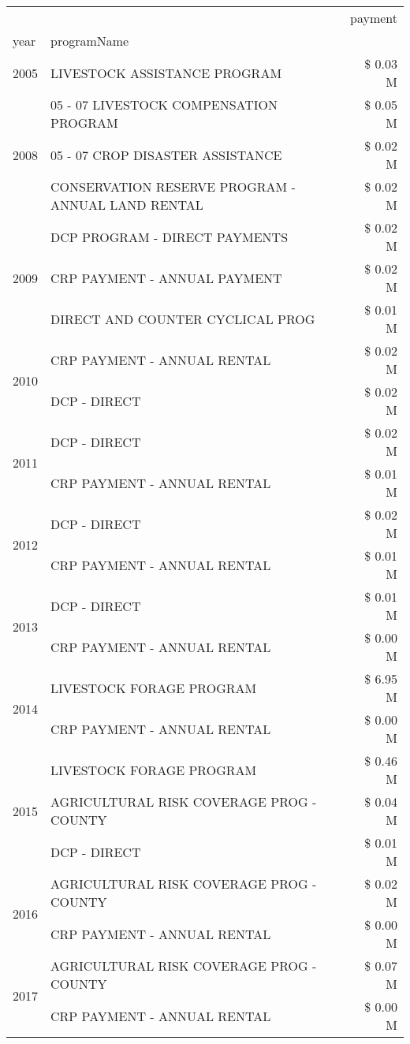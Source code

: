 \begin{tabular}{llr}
\toprule
 &  & payment \\
year & programName &  \\
\midrule
2005 & LIVESTOCK ASSISTANCE PROGRAM & \$ 0.03 M \\
\cline{1-3}
\multirow[t]{3}{*}{2008} & 05 - 07 LIVESTOCK COMPENSATION PROGRAM & \$ 0.05 M \\
 & 05 - 07 CROP DISASTER ASSISTANCE & \$ 0.02 M \\
 & CONSERVATION RESERVE PROGRAM - ANNUAL LAND RENTAL & \$ 0.02 M \\
\cline{1-3}
\multirow[t]{3}{*}{2009} & DCP PROGRAM - DIRECT PAYMENTS & \$ 0.02 M \\
 & CRP PAYMENT - ANNUAL PAYMENT & \$ 0.02 M \\
 & DIRECT AND COUNTER CYCLICAL PROG & \$ 0.01 M \\
\cline{1-3}
\multirow[t]{2}{*}{2010} & CRP PAYMENT - ANNUAL RENTAL & \$ 0.02 M \\
 & DCP - DIRECT & \$ 0.02 M \\
\cline{1-3}
\multirow[t]{2}{*}{2011} & DCP - DIRECT & \$ 0.02 M \\
 & CRP PAYMENT - ANNUAL RENTAL & \$ 0.01 M \\
\cline{1-3}
\multirow[t]{2}{*}{2012} & DCP - DIRECT & \$ 0.02 M \\
 & CRP PAYMENT - ANNUAL RENTAL & \$ 0.01 M \\
\cline{1-3}
\multirow[t]{2}{*}{2013} & DCP - DIRECT & \$ 0.01 M \\
 & CRP PAYMENT - ANNUAL RENTAL & \$ 0.00 M \\
\cline{1-3}
\multirow[t]{2}{*}{2014} & LIVESTOCK FORAGE PROGRAM & \$ 6.95 M \\
 & CRP PAYMENT - ANNUAL RENTAL & \$ 0.00 M \\
\cline{1-3}
\multirow[t]{3}{*}{2015} & LIVESTOCK FORAGE PROGRAM & \$ 0.46 M \\
 & AGRICULTURAL RISK COVERAGE PROG - COUNTY & \$ 0.04 M \\
 & DCP - DIRECT & \$ 0.01 M \\
\cline{1-3}
\multirow[t]{2}{*}{2016} & AGRICULTURAL RISK COVERAGE PROG - COUNTY & \$ 0.02 M \\
 & CRP PAYMENT - ANNUAL RENTAL & \$ 0.00 M \\
\cline{1-3}
\multirow[t]{2}{*}{2017} & AGRICULTURAL RISK COVERAGE PROG - COUNTY & \$ 0.07 M \\
 & CRP PAYMENT - ANNUAL RENTAL & \$ 0.00 M \\

\end{tabular}
